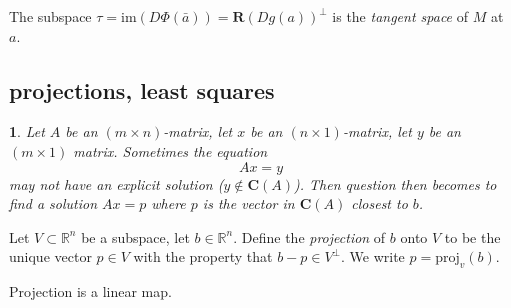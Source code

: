 \documentclass[12pt]{article}
\newtheorem{para}[theorem]{}
\begin{document}
\begin{remark}
	The subspace $\tau=\text{im}(D\Phi(\bar{a}))=\mathbf{R}(Dg(a))^\perp$ is the \emph{tangent space} of $M$ at $a$.
\end{remark}


\subsection{projections, least squares} %

\begin{para} 
	Let $A$ be an $(m\times n)$-matrix, let $x$ be an $(n\times 1)$-matrix, let $y$ be an $(m\times 1)$ matrix. Sometimes the equation 
	\begin{equation*}
		Ax=y
	\end{equation*}
	may not have an explicit solution ($y\not\in\mathbf{C}(A)$). Then question then becomes to find a solution $Ax=p$ where $p$ is the vector in $\mathbf{C}(A)$ closest to $b$.
\end{para}	

\begin{definition}
	Let $V\subset\mathbb{R}^n$ be a subspace, let $b\in\mathbb{R}^n$. Define the \emph{projection} of $b$ onto $V$ to be the unique vector $p\in V$ with the property that $b-p\in V^\perp$. We write $p=\text{proj}_v(b)$.
\end{definition}

\begin{proposition}
	Projection is a linear map.
\end{proposition}
\end{document}
